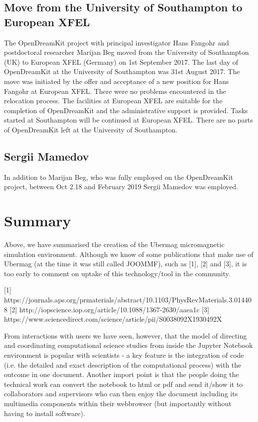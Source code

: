 \documentclass{deliverablereport}
\begin{document}
\subsection{Move from the University of Southampton to European XFEL}

The OpenDreamKit project with principal investigator Hans Fangohr and
postdoctoral researcher Marijan Beg moved from the University of
Southampton (UK) to European XFEL (Germany) on 1st September 2017. The
last day of OpenDreamKit at the University of Southampton was 31st
August 2017. The move was initiated by the offer and acceptance of a
new position for Hans Fangohr at European XFEL. There were no problems
encountered in the relocation process. The facilities at European XFEL
are suitable for the completion of OpenDreamKit and the administrative
support is provided. Tasks started at Southampton will be continued at
European XFEL. There are no parts of OpenDreamKit left at the
University of Southampton.

\subsection{Sergii Mamedov}

In addition to Marijan Beg, who was fully employed on the OpenDreamKit
project, between Oct 2.18 and February 2019 Sergii Mamedov was
employed.

\section{Summary}

Above, we have summarised the creation of the Ubermag micromagnetic
simulation environment. Although we know of some publications
that make use of Ubermag (at the time it was still called JOOMMF),
such as [1], [2] and [3], it is too early to comment on uptake of this
technology/tool in the community.

[1] https://journals.aps.org/prmaterials/abstract/10.1103/PhysRevMaterials.3.014408
[2] http://iopscience.iop.org/article/10.1088/1367-2630/aaea1c
[3] https://www.sciencedirect.com/science/article/pii/S0038092X1930492X

From interactions with users we have seen, however, that the model of
directing and coordinating computational science studies from inside
the Jupyter Notebook environment is popular with scientists - a key
feature is the integration of code (i.e. the detailed and exact
description of the computational process) with the outcome in one
document. Another import point is that the people doing the technical
work can convert the notebook to html or pdf and send it/show it to
collaborators and supervisors who can then enjoy the document
including its multimedia components within their webbrowser (but
importantly without having to install software).
\end{document}
